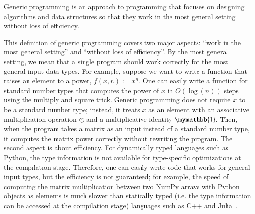 \documentclass[review, onefignum, onetabnum]{siamart190516}
\begin{document}
\begin{definition}
   Generic programming is an approach to programming that focuses on designing algorithms and data structures so that they work in the most general setting without loss of efficiency.
\end{definition}
This definition of generic programming covers two major aspects: ``work in the most general setting'' and ``without loss of efficiency''.
By the most general setting, we mean that a single program should work correctly for the most general input data types. 
For example, suppose we want to write a function that raises an element to a power, $f(x, n) := x^n$.
One can easily write a function for standard number types that computes the power of $x$ in $O \left( \log(n) \right)$ steps using the multiply and square trick.
Generic programming does not require $x$ to be a standard number type;
instead, it treats $x$ as an element with an associative multiplication operation $\odot$ and a multiplicative identity $\mymathbb{1}$.
Then, when the program takes a matrix as an input instead of a standard number type, it computes the matrix power correctly without rewriting the program.
The second aspect is about efficiency. For dynamically typed languages such as Python, the type information is not available for type-specific optimizations at the compilation stage.
Therefore, one can easily write code that works for general input types, but the efficiency is not guaranteed; for example, the speed of computing the matrix multiplication between two NumPy arrays with Python objects as elements is much slower than statically typed (i.e. the type information can be accessed at the compilation stage) languages such as C++ and Julia~\cite{Bezanson2012}.
\end{document}
